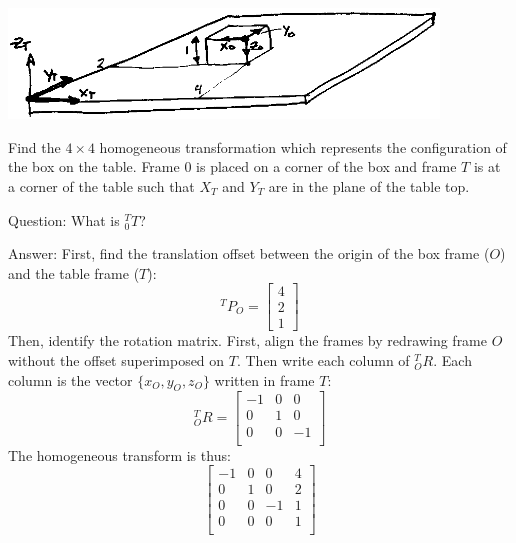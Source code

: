 \begin{Example}
\begin{center}
\includegraphics[width=4.5in]{figs02/00333.eps}
\end{center}

Find the $4\times 4$ homogeneous transformation which represents the configuration of the box on the table.   Frame $0$ is placed on a corner of the box and frame $T$ is at a corner of the table such that $X_T$ and $Y_T$ are in the plane of the table top.

Question:  What is $^T_0T$?

Answer:  First, find the translation offset between the origin of the box frame ($O$) and the table frame ($T$):
\[
^TP_O = \begin{bmatrix} 4 \\ 2 \\ 1 \end{bmatrix}
\]
Then, identify the rotation matrix.  First, align the frames by redrawing frame $O$ without the offset superimposed on $T$.  Then write each column of $^T_OR$.  Each column is the vector $\{x_O, y_O, z_O\}$ written in frame $T$:
\[
^T_OR = \begin{bmatrix}
-1 & 0 & 0 \\
0 & 1 & 0  \\
0 & 0 & -1 \\
\end{bmatrix}
\]
The homogeneous transform is thus:
\[\begin{bmatrix}
 -1   &   0  &  0  &  4  \\
  0   &   1  &  0  &  2  \\
  0   &   0  &  -1 &  1  \\
  0   &   0  &   0 &  1  \\
\end{bmatrix}
\]
\end{Example}

